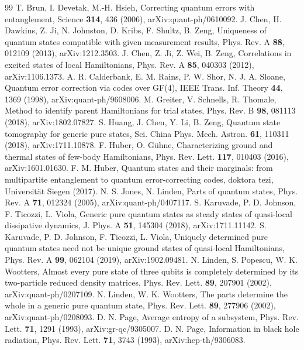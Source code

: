 \documentclass[aps,pra,onecolumn,superscriptaddress,nofootinbib,longbibliography,10pt]{revtex4-2}
\theoremstyle{definition}
\begin{document}
\begin{thebibliography}{99}
 T. Brun, I. Devetak, M.-H. Hsieh, Correcting quantum errors with entanglement, Science \textbf{314}, 436 (2006), arXiv:quant-ph/0610092.
 J. Chen, H. Dawkins, Z. Ji, N. Johnston, D. Kribs, F. Shultz, B. Zeng, Uniqueness of quantum states compatible with given measurement results, Phys. Rev. A \textbf{88}, 012109 (2013), arXiv:1212.3503.
 J. Chen, Z. Ji, Z. Wei, B. Zeng, Correlations in excited states of local Hamiltonians, Phys. Rev. A \textbf{85}, 040303 (2012), arXiv:1106.1373.
 A. R. Calderbank, E. M. Rains, P. W. Shor, N. J. A. Sloane, Quantum error correction via codes over GF(4), IEEE Trans. Inf. Theory \textbf{44}, 1369 (1998), arXiv:quant-ph/9608006.
 M. Greiter, V. Schnells, R. Thomale, Method to identify parent Hamiltonians for trial states, Phys. Rev. B \textbf{98}, 081113 (2018), arXiv:1802.07827.
 S. Huang, J. Chen, Y. Li, B. Zeng, Quantum state tomography for generic pure states, Sci. China Phys. Mech. Astron. \textbf{61}, 110311 (2018), arXiv:1711.10878.
 F. Huber, O. Gühne, Characterizing ground and thermal states of few-body Hamiltonians, Phys. Rev. Lett. \textbf{117}, 010403 (2016), arXiv:1601.01630.
 F. M. Huber, Quantum states and their marginals: from multipartite entanglement to quantum error-correcting codes, doktora tezi, Universität Siegen (2017).
 N. S. Jones, N. Linden, Parts of quantum states, Phys. Rev. A \textbf{71}, 012324 (2005), arXiv:quant-ph/0407117.
 S. Karuvade, P. D. Johnson, F. Ticozzi, L. Viola, Generic pure quantum states as steady states of quasi-local dissipative dynamics, J. Phys. A \textbf{51}, 145304 (2018), arXiv:1711.11142.
 S. Karuvade, P. D. Johnson, F. Ticozzi, L. Viola, Uniquely determined pure quantum states need not be unique ground states of quasi-local Hamiltonians, Phys. Rev. A \textbf{99}, 062104 (2019), arXiv:1902.09481.
 N. Linden, S. Popescu, W. K. Wootters, Almost every pure state of three qubits is completely determined by its two-particle reduced density matrices, Phys. Rev. Lett. \textbf{89}, 207901 (2002), arXiv:quant-ph/0207109.
 N. Linden, W. K. Wootters, The parts determine the whole in a generic pure quantum state, Phys. Rev. Lett. \textbf{89}, 277906 (2002), arXiv:quant-ph/0208093.
 D. N. Page, Average entropy of a subsystem, Phys. Rev. Lett. \textbf{71}, 1291 (1993), arXiv:gr-qc/9305007.
 D. N. Page, Information in black hole radiation, Phys. Rev. Lett. \textbf{71}, 3743 (1993), arXiv:hep-th/9306083.

\end{thebibliography}
\end{document}
